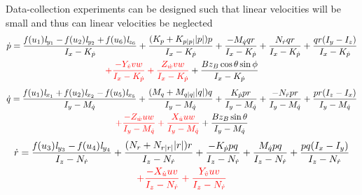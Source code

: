 \documentclass[11pt,aspectratio=169]{beamer}
\begin{document}
\begin{frame}[shrink]
Data-collection experiments can be designed such that linear velocities will be small and thus can linear velocities be neglected
\begin{multline*}
\dot{p} = \frac{\mathit{f}(u_{1}) \mathit{l}_{y_{1}} - \mathit{f}(u_{2}) \mathit{l}_{y_{2}} + \mathit{f}(u_{6}) \mathit{l}_{z_{6}}}{I_{x} - K_{\dot{p}}} + \frac{ (K_{p} + K_{p|p|} |p|)p}{I_{x} - K_{\dot{p}}}  + \frac{-M_{\dot{q}} q r}{I_{x} - K_{\dot{p}}} +  \frac{N_{\dot{r}} q r}{I_{x} - K_{\dot{p}}}  + \frac{q r (I_{y} - I_{z})}{I_{x} - K_{\dot{p}}} \\{\color{red} + \frac{- Y_{\dot{v}} v w}{I_{x} - K_{\dot{p}}} + \frac{Z_{\dot{w}} v w}{I_{x} - K_{\dot{p}}}} + \frac{B z_B \cos{\theta} \sin{\phi}}{I_{x} - K_{\dot{p}}}
\end{multline*}
\begin{multline*}
\dot{q} =\frac{\mathit{f}(u_{1}) \mathit{l}_{x_{1}} + \mathit{f}(u_{2}) \mathit{l}_{x_{2}} - \mathit{f}(u_{5}) \mathit{l}_{x_{5}}}{I_{y} - M_{\dot{q}}} + \frac{(M_{q} + M_{q|q|} |q|)q}{I_{y} - M_{\dot{q}}} + \frac{K_{\dot{p}} p r}{I_{y} - M_{\dot{q}}} + \frac{-N_{\dot{r}} p r}{I_{y} - M_{\dot{q}}}  +
\frac{p r (I_{z} - I_{x})}{I_{y} - M_{\dot{q}}} \\ {\color{red} + \frac{-Z_{\dot{w}} u w}{I_{y} - M_{\dot{q}}} + \frac{X_{\dot{u}} u w}{I_{y} - M_{\dot{q}}}} + \frac{B z_B \sin{\theta} }{I_{y} - M_{\dot{q}}} 
\end{multline*}
\begin{multline*}
\dot{r} = \frac{\mathit{f}(u_{3}) \mathit{l}_{y_{3}} - \mathit{f}(u_{4}) \mathit{l}_{y_{4}}}{I_{z} - N_{\dot{r}}} + \frac{(N_{r} + N_{r|r|} |r|)r}{I_{z} - N_{\dot{r}}} + \frac{-K_{\dot{p}} p q}{I_{z} - N_{\dot{r}}} + \frac{M_{\dot{q}} p q}{I_{z} - N_{\dot{r}}} + \frac{p q (I_{x} - I_{y})}{I_{z} - N_{\dot{r}}}\\ {\color{red} + \frac{- X_{\dot{u}} u v}{I_{z} - N_{\dot{r}}} + \frac{Y_{\dot{v}} u v}{I_{z} - N_{\dot{r}}}}
\end{multline*}
\end{frame}
\end{document}
